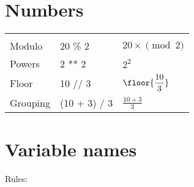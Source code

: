 \section{Numbers}
\begin{center}
    \begin{tabular}{ |p{5cm}|p{5cm}|p{5cm}| }
        \hline\\[0.25cm]
            Modulo & 20 \% 2 & $\displaystyle 20\times\pmod{2}$  \\[0.45cm]
            \hline
            Powers & 2 ** 2  & $\displaystyle 2^2$  \\[0.45cm]
            \hline
            Floor & 10 // 3  & $\displaystyle \floor{\frac{10}{3} } $  \\[0.45cm]
            \hline
            Grouping & (10 + 3) / 3 & $\displaystyle \frac{10+3}{3} $ \\[0.45cm] 
        \hline
    \end{tabular}
\end{center}

\section{Variable names}
Rules: 
